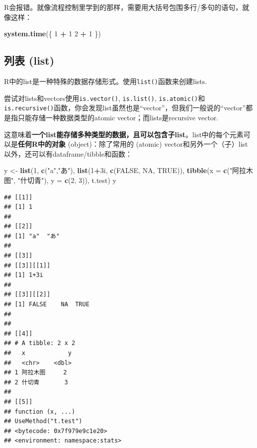 \documentclass[]{book}
\newenvironment{Shaded}{\begin{snugshade}}{\end{snugshade}}
\newcommand{\DataTypeTok}[1]{\textcolor[rgb]{0.13,0.29,0.53}{#1}}
\newcommand{\DecValTok}[1]{\textcolor[rgb]{0.00,0.00,0.81}{#1}}
\newcommand{\KeywordTok}[1]{\textcolor[rgb]{0.13,0.29,0.53}{\textbf{#1}}}
\newcommand{\NormalTok}[1]{#1}
\newcommand{\OperatorTok}[1]{\textcolor[rgb]{0.81,0.36,0.00}{\textbf{#1}}}
\newcommand{\OtherTok}[1]{\textcolor[rgb]{0.56,0.35,0.01}{#1}}
\newcommand{\StringTok}[1]{\textcolor[rgb]{0.31,0.60,0.02}{#1}}
\begin{document}
R会报错。就像流程控制里学到的那样，需要用大括号包围多行/多句的语句，就像这样：

\begin{Shaded}
\begin{Highlighting}[]
\KeywordTok{system.time}\NormalTok{(\{}
  \DecValTok{1} \OperatorTok{+}\StringTok{ }\DecValTok{1}
  \DecValTok{2} \OperatorTok{+}\StringTok{ }\DecValTok{1}
\NormalTok{\})}
\end{Highlighting}
\end{Shaded}

\hypertarget{list}{%
\subsection{列表 (list)}\label{list}}

R中的list是一种特殊的数据存储形式。使用\texttt{list()}函数来创建lists.

尝试对lists和vectors使用\texttt{is.vector()}, \texttt{is.list()}, \texttt{is.atomic()}和\texttt{is.recursive()}函数，你会发现list虽然也是``vector''，但我们一般说的``vector''都是指只能存储一种数据类型的atomic vector；而lists是recursive vector.

这意味着\textbf{一个list能存储多种类型的数据，且可以包含子list}。list中的每个元素可以是\textbf{任何R中的对象} (object)：除了常用的 (atomic) vector和另外一个（子）list以外，还可以有dataframe/tibble和函数：

\begin{Shaded}
\begin{Highlighting}[]
\NormalTok{y <-}\StringTok{ }\KeywordTok{list}\NormalTok{(}\DecValTok{1}\NormalTok{, }\KeywordTok{c}\NormalTok{(}\StringTok{"a"}\NormalTok{,}\StringTok{"あ"}\NormalTok{), }\KeywordTok{list}\NormalTok{(}\DecValTok{1}\OperatorTok{+}\NormalTok{3i, }\KeywordTok{c}\NormalTok{(}\OtherTok{FALSE}\NormalTok{, }\OtherTok{NA}\NormalTok{, }\OtherTok{TRUE}\NormalTok{)), }
          \KeywordTok{tibble}\NormalTok{(}\DataTypeTok{x =} \KeywordTok{c}\NormalTok{(}\StringTok{"阿拉木图"}\NormalTok{, }\StringTok{"什切青"}\NormalTok{), }\DataTypeTok{y =} \KeywordTok{c}\NormalTok{(}\DecValTok{2}\NormalTok{, }\DecValTok{3}\NormalTok{)),}
\NormalTok{          t.test)}
\NormalTok{y}
\end{Highlighting}
\end{Shaded}

\begin{verbatim}
## [[1]]
## [1] 1
## 
## [[2]]
## [1] "a"  "あ"
## 
## [[3]]
## [[3]][[1]]
## [1] 1+3i
## 
## [[3]][[2]]
## [1] FALSE    NA  TRUE
## 
## 
## [[4]]
## # A tibble: 2 x 2
##   x            y
##   <chr>    <dbl>
## 1 阿拉木图     2
## 2 什切青       3
## 
## [[5]]
## function (x, ...) 
## UseMethod("t.test")
## <bytecode: 0x7f979e9c1e20>
## <environment: namespace:stats>
\end{verbatim}
\end{document}
